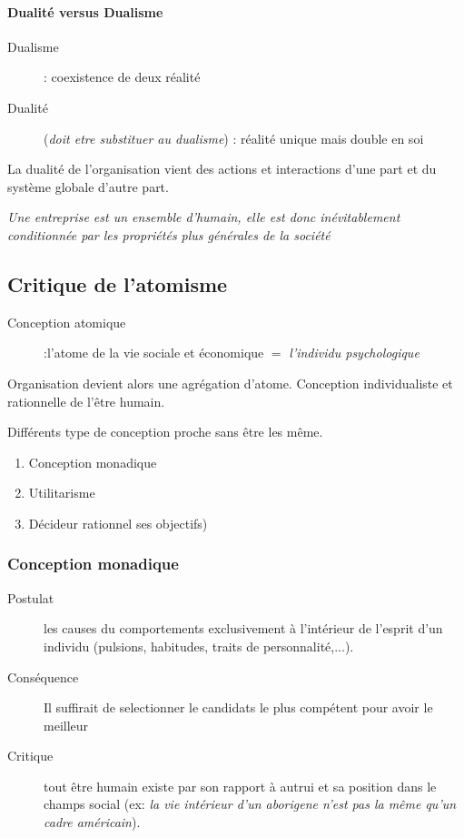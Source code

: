 \documentclass[11pt]{article} %
\begin{document}
\paragraph{Dualité  versus  Dualisme}  
\begin{description}
    \item[Dualisme] : coexistence de deux réalité
    \item[Dualité] (\textit{doit etre substituer au dualisme}) : réalité
        unique mais double en soi
\end{description}

La dualité de l'organisation vient des actions et interactions d'une
part et du système globale d'autre part.

\textit{Une entreprise est un ensemble d'humain, elle est donc
inévitablement conditionnée par les propriétés plus générales de la
société}


\subsection{Critique de l'atomisme}

\begin{description}
\item[Conception atomique] :l'atome de la vie sociale et économique $=$ \textit{l'individu psychologique}
\end{description}

Organisation devient alors une agrégation d'atome. Conception          
individualiste et rationnelle de l'être humain.                        

Différents type de conception proche sans être les même.
\begin{enumerate}
    \item Conception monadique 
    \item Utilitarisme 
    \item Décideur rationnel 
        ses objectifs)
\end{enumerate}

\subsubsection{Conception monadique}

\begin{description}
    \item[Postulat] les causes du comportements exclusivement à l'intérieur de l'esprit d'un individu (pulsions, habitudes, traits de personnalité,...).
    \item[Conséquence] Il suffirait de selectionner le candidats le plus compétent pour avoir le meilleur
    \item[Critique] tout être humain existe par son rapport à autrui et sa position dans le champs social (ex: \textit{la vie intérieur d'un aborigene n'est pas la même qu'un cadre américain}).
\end{description}
\end{document}
